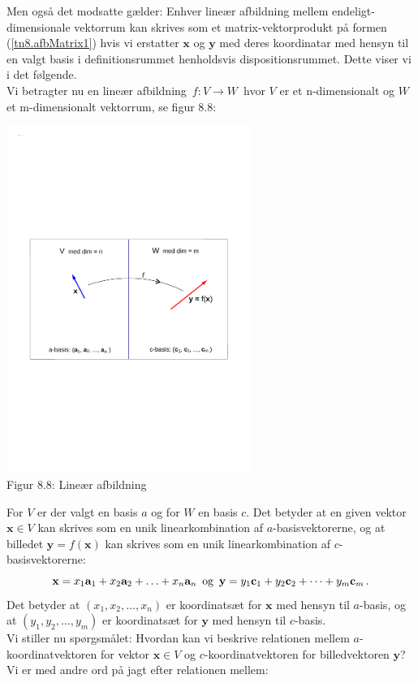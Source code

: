 Men også det modsatte gælder: Enhver lineær afbildning mellem endeligt-dimensionale vektorrum kan skrives som et matrix-vektorprodukt på formen (\ref{tn8.afbMatrix1}) hvis vi erstatter $\mathbf x$ og $\mathbf y$ med deres koordinatar med hensyn til en valgt basis i definitionsrummet henholdsvis dispositionsrummet. Dette viser vi i det følgende.\\

Vi betragter nu en lineær afbildning $\,f:V\rightarrow W\,$ hvor $V$ er et n-dimensionalt og $W$ et m-dimensionalt vektorrum, se figur 8.8:
\begin{center}
		\includegraphics[trim=2cm 9cm 2cm
 9cm,width=0.60\textwidth,clip]{linAfbVW.pdf}
  \\Figur 8.8: Lineær afbildning 
\end{center}

For $V$ er der valgt en basis $a$ og for $W$ en basis $c$. Det betyder at en given vektor $\mathbf x \in V$ kan skrives som  en unik linearkombination af $a$-basisvektorerne, og at billedet $\mathbf y = f(\mathbf x)$ kan skrives som  en unik linearkombination af $c$-basisvektorerne:
$$\mathbf x=x_1\mathbf{a}_1+x_2\mathbf{a}_2+\ldots+x_n\mathbf{a}_n\,\,\,\mathrm{og}\,\,\,
\mathbf y=y_1\mathbf{c}_1+y_2\mathbf{c}_2+\cdots+y_m\mathbf{c}_m\,.$$
Det betyder at $(x_1,x_2,\ldots,x_n)$ er koordinatsæt for $\mathbf x$ med hensyn til $a$-basis, og at $(y_1,y_2,\ldots,y_m)$ er koordinatsæt for $\mathbf y$ med hensyn til $c$-basis.\\

Vi stiller nu spørgsmålet: Hvordan kan vi beskrive relationen mellem $a$-koordinatvektoren for vektor $\mathbf x \in V$ og $c$-koordinatvektoren for billedvektoren $\mathbf y$? Vi er med andre ord på jagt efter relationen mellem:

